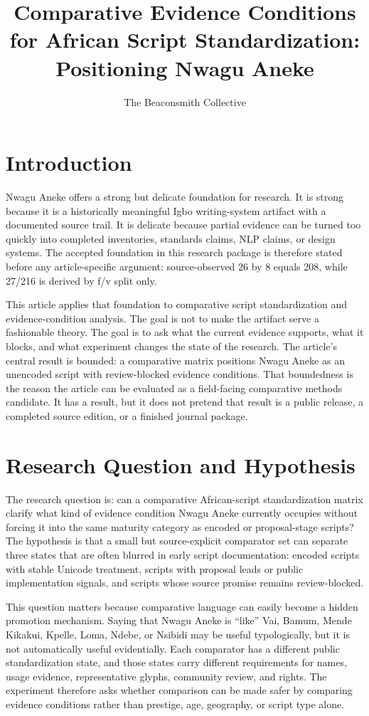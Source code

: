 \documentclass[sigconf,nonacm]{acmart}
\title{Comparative Evidence Conditions for African Script Standardization: Positioning Nwagu Aneke}
\author{The Beaconsmith Collective}
\affiliation{\institution{Etisiobi Research Studio}\city{Enugu}\country{Nigeria}}
\begin{document}
\maketitle

\section{Introduction}
Nwagu Aneke offers a strong but delicate foundation for research. It is strong
because it is a historically meaningful Igbo writing-system artifact with a
documented source trail. It is delicate because partial evidence can be turned
too quickly into completed inventories, standards claims, NLP claims, or design
systems. The accepted foundation in this research package is therefore stated
before any article-specific argument: source-observed 26 by 8 equals 208, while
27/216 is derived by f/v split only.

This article applies that foundation to comparative script standardization and evidence-condition analysis. The goal is not to make the
artifact serve a fashionable theory. The goal is to ask what the current
evidence supports, what it blocks, and what experiment changes the state of the
research. The article's central result is bounded: a comparative matrix positions Nwagu Aneke as an unencoded script with review-blocked evidence conditions. That boundedness is
the reason the article can be evaluated as a field-facing comparative methods
candidate. It has a result, but it does not pretend that result is a public
release, a completed source edition, or a finished journal package.

\section{Research Question and Hypothesis}
The research question is: can a comparative African-script standardization
matrix clarify what kind of evidence condition Nwagu Aneke currently occupies
without forcing it into the same maturity category as encoded or proposal-stage
scripts? The hypothesis is that a small but source-explicit comparator set can
separate three states that are often blurred in early script documentation:
encoded scripts with stable Unicode treatment, scripts with proposal leads or
public implementation signals, and scripts whose source promise remains
review-blocked.

This question matters because comparative language can easily become a hidden
promotion mechanism. Saying that Nwagu Aneke is ``like'' Vai, Bamum, Mende
Kikakui, Kpelle, Loma, Ndebe, or Nsibidi may be useful typologically, but it is
not automatically useful evidentially. Each comparator has a different public
standardization state, and those states carry different requirements for names,
usage evidence, representative glyphs, community review, and rights. The
experiment therefore asks whether comparison can be made safer by comparing
evidence conditions rather than prestige, age, geography, or script type alone.
\end{document}
